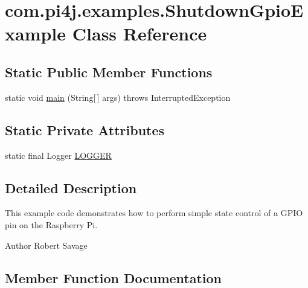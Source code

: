 \hypertarget{classcom_1_1pi4j_1_1examples_1_1ShutdownGpioExample}{}\section{com.\+pi4j.\+examples.\+Shutdown\+Gpio\+Example Class Reference}
\label{classcom_1_1pi4j_1_1examples_1_1ShutdownGpioExample}
\subsection*{Static Public Member Functions}
\begin{DoxyCompactItemize}
\item 
static void \hyperlink{classcom_1_1pi4j_1_1examples_1_1ShutdownGpioExample_a2976cb7fe7dd9845b75e5387e8361085}{main} (String\mbox{[}$\,$\mbox{]} args)  throws Interrupted\+Exception 
\end{DoxyCompactItemize}
\subsection*{Static Private Attributes}
\begin{DoxyCompactItemize}
\item 
static final Logger \hyperlink{classcom_1_1pi4j_1_1examples_1_1ShutdownGpioExample_a5a7ffab846490e66fc924e9685a45eea}{L\+O\+G\+G\+E\+R}
\end{DoxyCompactItemize}


\subsection{Detailed Description}
This example code demonstrates how to perform simple state control of a G\+P\+I\+O pin on the Raspberry Pi.

\begin{DoxyAuthor}{Author}
Robert Savage 
\end{DoxyAuthor}


\subsection{Member Function Documentation}
\hypertarget{classcom_1_1pi4j_1_1examples_1_1ShutdownGpioExample_a2976cb7fe7dd9845b75e5387e8361085}{}
